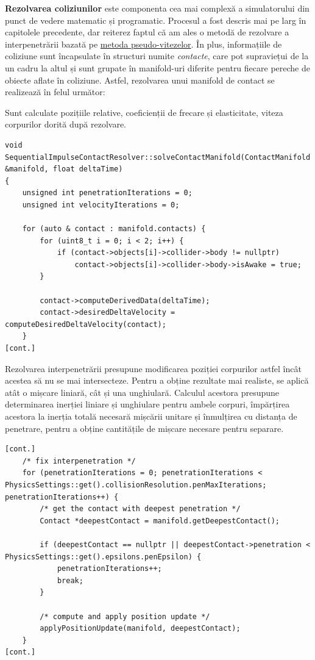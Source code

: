 \documentclass[12pt,a4paper]{report}
\begin{document}
\textbf{Rezolvarea coliziunilor} este componenta cea mai complexă a simulatorului din punct de vedere matematic și programatic. Procesul a fost descris mai pe larg în capitolele precedente, dar reiterez faptul că am ales o metodă de rezolvare a interpenetrării bazată pe \hyperref[pseudo_velocities]{metoda pseudo-vitezelor}. În plus, informațiile de coliziune sunt încapsulate în structuri numite \textit{contacte}, care pot supraviețui de la un cadru la altul și sunt grupate în manifold-uri diferite pentru fiecare pereche de obiecte aflate în coliziune.  Astfel, rezolvarea unui manifold de contact se realizează în felul următor:

Sunt calculate pozițiile relative, coeficienții de frecare și elasticitate, viteza corpurilor dorită după rezolvare.
\begin{lstlisting}[style=myC++, label={code:solveManifold_a}]
void SequentialImpulseContactResolver::solveContactManifold(ContactManifold &manifold, float deltaTime)
{
	unsigned int penetrationIterations = 0;
	unsigned int velocityIterations = 0;

	for (auto & contact : manifold.contacts) {
		for (uint8_t i = 0; i < 2; i++) {
			if (contact->objects[i]->collider->body != nullptr)
				contact->objects[i]->collider->body->isAwake = true;
		}

		contact->computeDerivedData(deltaTime);
		contact->desiredDeltaVelocity = computeDesiredDeltaVelocity(contact);
	}
[cont.]
\end{lstlisting}

Rezolvarea interpenetrării presupune modificarea poziției corpurilor astfel încât acestea să nu se mai intersecteze. Pentru a obține rezultate mai realiste, se aplică atât o mișcare liniară, cât și una unghiulară. Calculul acestora presupune determinarea inerției liniare și unghiulare pentru ambele corpuri, împărțirea acestora la inerția totală necesară mișcării unitare și înmulțirea cu distanța de penetrare, pentru a obține cantitățile de mișcare necesare pentru separare.
\begin{lstlisting}[style=myC++, label={code:solveManifold_b}]
[cont.]
	/* fix interpenetration */
	for (penetrationIterations = 0; penetrationIterations < PhysicsSettings::get().collisionResolution.penMaxIterations; penetrationIterations++) {
		/* get the contact with deepest penetration */
		Contact *deepestContact = manifold.getDeepestContact();

		if (deepestContact == nullptr || deepestContact->penetration < PhysicsSettings::get().epsilons.penEpsilon) {
			penetrationIterations++;
			break;
		}

		/* compute and apply position update */
		applyPositionUpdate(manifold, deepestContact);
	}
[cont.]
\end{lstlisting}
\end{document}
